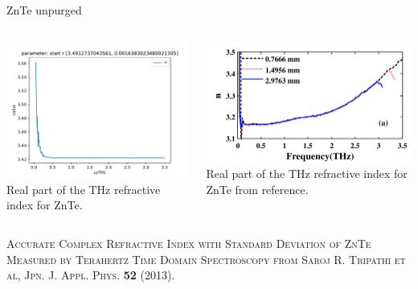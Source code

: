 \documentclass[aspectratio=1610, 9pt]{beamer}
\begin{document}
\begin{frame}{}
  ZnTe unpurged
  \begin{columns}
    \begin{column}{0.5\textwidth}
      \includegraphics[width=\textwidth]{images/ZnTe1mm_purged_nofilter/frequncy_against_n_k.pdf}
      {Real part of the THz refractive index for ZnTe.}
    \end{column} 
    \begin{column}{0.5\textwidth}
      \includegraphics[width=\textwidth]{images/nZnTe.png}
      {Real part of the THz refractive index for ZnTe from reference.}
    \end{column}
  \end{columns}
  \textsc{\textcolor{tugreen}{Accurate Complex Refractive Index with Standard
  Deviation of ZnTe Measured by Terahertz Time
  Domain Spectroscopy} from Saroj R. Tripathi
  et al, Jpn. J. Appl. Phys. \textbf{52} (2013).}
\end{frame}
\end{document}
